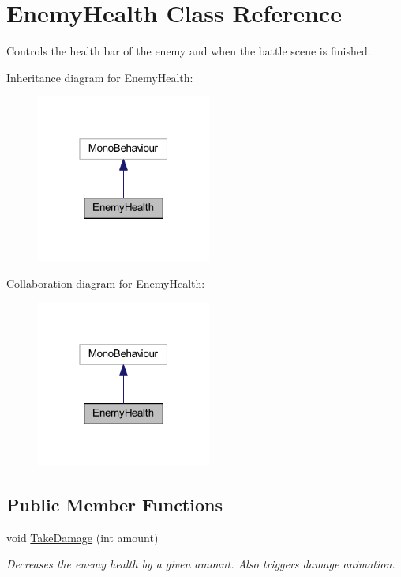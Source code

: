 \hypertarget{class_enemy_health}{}\section{Enemy\+Health Class Reference}
\label{class_enemy_health}


Controls the health bar of the enemy and when the battle scene is finished.  




Inheritance diagram for Enemy\+Health\+:\nopagebreak
\begin{figure}[H]
\begin{center}
\leavevmode
\includegraphics[width=163pt]{class_enemy_health__inherit__graph}
\end{center}
\end{figure}


Collaboration diagram for Enemy\+Health\+:\nopagebreak
\begin{figure}[H]
\begin{center}
\leavevmode
\includegraphics[width=163pt]{class_enemy_health__coll__graph}
\end{center}
\end{figure}
\subsection*{Public Member Functions}
\begin{DoxyCompactItemize}
\item 
void \mbox{\hyperlink{class_enemy_health_a4eb105bf6071ecd489d48a045de31a7c}{Take\+Damage}} (int amount)
\begin{DoxyCompactList}\small\item\em Decreases the enemy health by a given amount. Also triggers damage animation. \end{DoxyCompactList}\end{DoxyCompactItemize}
